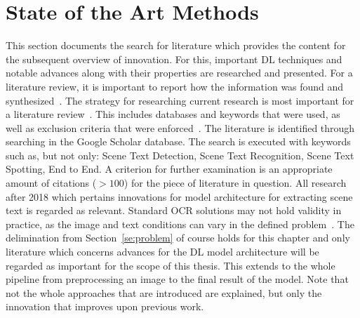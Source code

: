 \section{State of the Art Methods}\label{se:innovations}
This section documents the search for literature which provides the content for the subsequent
overview of innovation.
For this, important \ac{DL} techniques and notable advances along with their properties are researched
and presented.
For a literature review, it is important to report how the information was found and
synthesized~\citep{torraco_writing_2005}.
The strategy for researching current research is most important for a literature
review~\citep{snyder_literature_2019}.
This includes databases and keywords that were used, as well as exclusion criteria that were
enforced~\citep{torraco_writing_2005}.
The literature is identified through searching in the Google Scholar database.
The search is executed with keywords such as, but not only: Scene Text Detection,
Scene Text Recognition, Scene Text Spotting, End to End.
A criterion for further examination is an appropriate amount of citations ($>100$) for the piece of
literature in question.
All research after 2018 which pertains innovations for model architecture for extracting scene
text is regarded as relevant.
Standard \ac{OCR} solutions may not hold validity in practice, as the image and text conditions can
vary in the defined problem~\citep{chen_text_2021}.
The delimination from Section~\ref{se:problem} of course holds for this chapter and only literature
which concerns advances for the \ac{DL} model architecture will be regarded as important for the
scope of this thesis.
This extends to the whole pipeline from preprocessing an image to the final result of the model.
Note that not the whole approaches that are introduced are explained, but only the innovation that
improves upon previous work.

